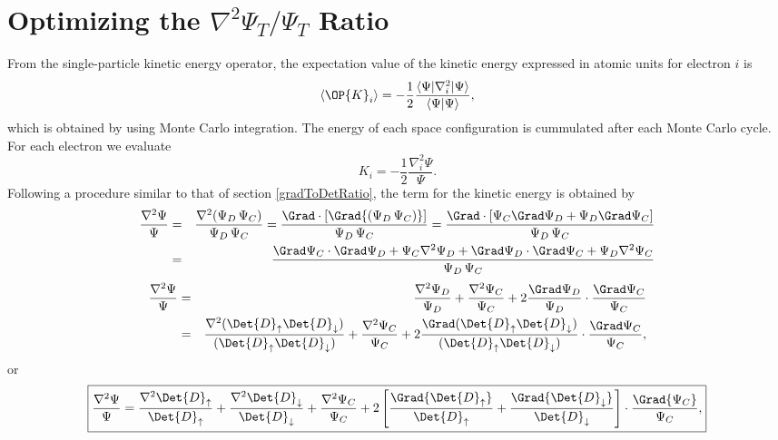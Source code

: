 \section{Optimizing the $\nabla^2 \Psi_T/\Psi_T$ Ratio}\label{kineticEnergyTerm}
From the single-particle kinetic energy operator, the expectation value of the kinetic energy expressed in atomic units for electron $i$ is 
\begin{equation}
 \langle \OP{K}_i \rangle = -\frac{1}{2}\frac{\langle\Psi|\nabla_{i}^2|\Psi \rangle}{\langle\Psi|\Psi \rangle},
\end{equation}
which is obtained by using Monte Carlo integration. The energy of each space con\-fi\-gu\-ra\-tion is cummulated after each Monte Carlo cycle. For each electron we evaluate
\begin{equation}\label{kineticE}
K_i = -\frac{1}{2}\frac{\nabla_{i}^{2} \Psi}{\Psi}.
\end{equation}
Following a procedure similar to that of section \ref{gradToDetRatio}, the term for the kinetic energy is obtained by
\begin{eqnarray}
\frac{\nabla^2 \Psi}{\Psi} & = & \frac{\nabla^2 ({\Psi_{D} \,  \Psi_C})}{\Psi_{D} \,  \Psi_C} = \frac{\Grad \cdot [\Grad {(\Psi_{D} \,  \Psi_C)}]}{\Psi_{D} \,  \Psi_C} = \frac{\Grad \cdot [ \Psi_C \Grad \Psi_{D} + \Psi_{D} \Grad  \Psi_C]}{\Psi_{D} \,  \Psi_C}\nonumber\\
&  = & \frac{\Grad  \Psi_C \cdot \Grad \Psi_{D} +  \Psi_C \nabla^2 \Psi_{D} + \Grad \Psi_{D} \cdot \Grad  \Psi_C + \Psi_{D} \nabla^2  \Psi_C}{\Psi_{D} \,  \Psi_C}\nonumber\\
\end{eqnarray}
\begin{eqnarray}
\frac{\nabla^2 \Psi}{\Psi}
& = & \frac{\nabla^2 \Psi_{D}}{\Psi_{D}} + \frac{\nabla^2  \Psi_C}{ \Psi_C} + 2 \frac{\Grad \Psi_{D}}{\Psi_{D}}\cdot\frac{\Grad  \Psi_C}{ \Psi_C}\nonumber\\
& = & \frac{\nabla^2 (\Det{D}_{\uparrow} \Det{D}_{\downarrow})}{(\Det{D}_{\uparrow} \Det{D}_{\downarrow})} + \frac{\nabla^2 \Psi_C}{\Psi_C} + 2 \frac{\Grad (\Det{D}_{\uparrow} \Det{D}_{\downarrow})}{(\Det{D}_{\uparrow} \Det{D}_{\downarrow})}\cdot\frac{\Grad \Psi_C}{\Psi_C},\nonumber
\end{eqnarray}
or 
\begin{equation}\label{laplacian_psi_psi_ratio}
\boxed{\frac{\nabla^2 \Psi}{\Psi} = \frac{\nabla^2 \Det{D}_{\uparrow}}{\Det{D}_{\uparrow}} + \frac{\nabla^2 \Det{D}_{\downarrow}}{\Det{D}_{\downarrow}} + \frac{\nabla^2 \Psi_C}{\Psi_C} + 2 \left[\frac{\Grad{\Det{D}_{\uparrow}}}{\Det{D}_{\uparrow}} +  \frac{\Grad{\Det{D}_{\downarrow}}}{\Det{D}_{\downarrow}}\right]\cdot \frac{\Grad{\Psi_C}}{\Psi_C},}
\end{equation}
